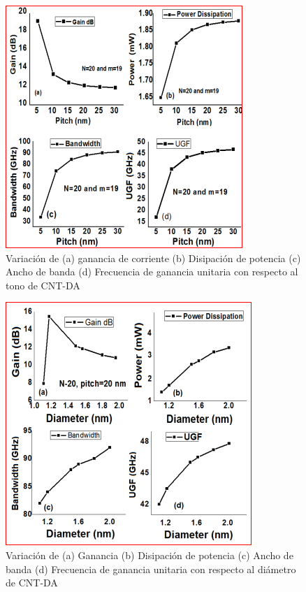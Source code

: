 \documentclass[conference]{IEEEtran} %
\begin{document}
	\begin{figure}[!h] 
		\centering
		\includegraphics[scale=0.8]{IMAGENES/5.PNG}
		\caption{Variación de (a) ganancia de corriente (b) Disipación de potencia (c) Ancho de banda (d) Frecuencia de ganancia unitaria con respecto al tono de CNT-DA \cite{Akhoon}}
	\end{figure}




	\begin{figure}[!h] 
		\centering
		\includegraphics[scale=0.8]{IMAGENES/6.PNG}
		\caption{Variación de (a) Ganancia (b) Disipación de potencia (c) Ancho de banda (d) Frecuencia de ganancia unitaria con respecto al diámetro de CNT-DA \cite{Akhoon}}
	\end{figure}


\end{document}
